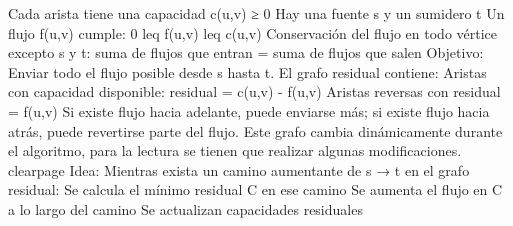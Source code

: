 \markdownRendererUlItem Cada arista tiene una capacidad c(u,v) ≥ 0\markdownRendererUlItemEnd 
\markdownRendererUlItem Hay una fuente s y un sumidero t\markdownRendererUlItemEnd 
\markdownRendererUlEndTight \markdownRendererInterblockSeparator
{}Un flujo f(u,v) cumple:\markdownRendererInterblockSeparator
{}\markdownRendererOlBeginTight
{}0 \markdownRendererDollarSign{}\markdownRendererBackslash{}leq\markdownRendererDollarSign{} f(u,v) \markdownRendererDollarSign{}\markdownRendererBackslash{}leq\markdownRendererDollarSign{} c(u,v)\markdownRendererOlItemEnd 
{}Conservación del flujo en todo vértice excepto s y t: suma de flujos que entran = suma de flujos que salen\markdownRendererOlItemEnd 
\markdownRendererOlEndTight \markdownRendererInterblockSeparator
{}Objetivo:\markdownRendererSoftLineBreak
{}Enviar todo el flujo posible desde s hasta t.\markdownRendererInterblockSeparator
{}
\markdownRendererSectionEnd \markdownRendererSectionBegin
{}\markdownRendererInterblockSeparator
{}El grafo residual contiene:\markdownRendererInterblockSeparator
{}\markdownRendererUlBeginTight
\markdownRendererUlItem Aristas con capacidad disponible: residual = c(u,v) - f(u,v)\markdownRendererUlItemEnd 
\markdownRendererUlItem Aristas reversas con residual = f(u,v)\markdownRendererUlItemEnd 
\markdownRendererUlEndTight \markdownRendererInterblockSeparator
{}Si existe flujo hacia adelante, puede enviarse más;\markdownRendererSoftLineBreak
{}si existe flujo hacia atrás, puede revertirse parte del flujo.\markdownRendererParagraphSeparator
{}Este grafo cambia dinámicamente durante el algoritmo, para la lectura se tienen que realizar algunas modificaciones.\markdownRendererInterblockSeparator
{}\markdownRendererInterblockSeparator
{}\markdownRendererDollarSign{}\markdownRendererBackslash{}clearpage\markdownRendererDollarSign{}\markdownRendererParagraphSeparator
{}
\markdownRendererSectionEnd \markdownRendererSectionBegin
{}\markdownRendererInterblockSeparator
{}Idea:\markdownRendererSoftLineBreak
{}Mientras exista un camino aumentante de s → t en el grafo residual:\markdownRendererInterblockSeparator
{}\markdownRendererUlBeginTight
\markdownRendererUlItem Se calcula el mínimo residual C en ese camino\markdownRendererUlItemEnd 
\markdownRendererUlItem Se aumenta el flujo en C a lo largo del camino\markdownRendererUlItemEnd 
\markdownRendererUlItem Se actualizan capacidades residuales\markdownRendererUlItemEnd 

